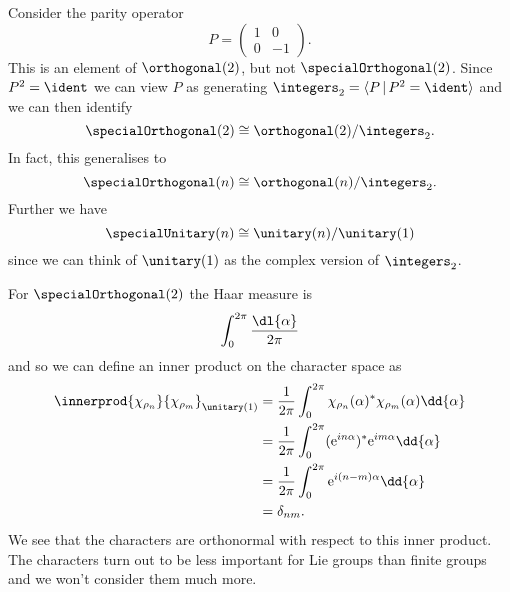 Consider the parity operator
\begin{equation}
    P = 
    \begin{pmatrix}
        1 & 0\\
        0 & -1
    \end{pmatrix}
    .
\end{equation}
This is an element of \(\orthogonal(2)\), but not \(\specialOrthogonal(2)\).
Since \(P^2 = \ident\) we can view \(P\) as generating \(\integers_2 = \presentation{P}{P^2 = \ident}\) and we can then identify
\begin{equation}
    \specialOrthogonal(2) \isomorphic \orthogonal(2) / \integers_2.
\end{equation}
In fact, this generalises to
\begin{equation}
    \specialOrthogonal(n) \isomorphic \orthogonal(n) / \integers_2.
\end{equation}
Further we have
\begin{equation}
    \specialUnitary(n) \isomorphic \unitary(n) / \unitary(1)
\end{equation}
since we can think of \(\unitary(1)\) as the complex version of \(\integers_2\).

For \(\specialOrthogonal(2)\) the Haar measure is
\begin{equation}
    \int_0^{2\pi} \frac{\dl{\alpha}}{2\pi}
\end{equation}
and so we can define an inner product on the character space as
\begin{align}
    \innerprod{\chi_{\rho_n}}{\chi_{\rho_m}}_{\unitary(1)} &= \frac{1}{2\pi}\int_{0}^{2\pi} \chi_{\rho_n}(\alpha)^* \chi_{\rho_m}(\alpha) \dd{\alpha}\\
    &= \frac{1}{2\pi} \int_{0}^{2\pi} (\e^{in\alpha})^*\e^{im\alpha} \dd{\alpha}\\
    &= \frac{1}{2\pi} \int_{0}^{2\pi} \e^{i(n - m)\alpha} \dd{\alpha}\\
    &= \delta_{nm}.
\end{align}
We see that the characters are orthonormal with respect to this inner product.
The characters turn out to be less important for Lie groups than finite groups and we won't consider them much more.

